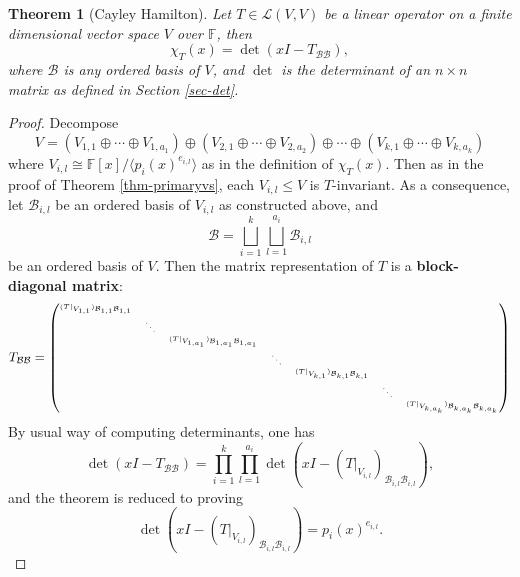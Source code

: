 \documentclass[12pt]{amsbook}
\newtheorem{theorem}{Theorem}[section]
\begin{document}
\begin{theorem}[Cayley Hamilton]
    Let $T \in \mathcal{L}(V,V)$ be a linear operator on a finite dimensional vector space $V$ over $\mathbb{F}$, then
    $$\chi_T(x) = \det(xI -T_{\mathcal{B}\mathcal{B}}),$$
    where $\mathcal{B}$ is any ordered basis of $V$, and $\det$ is the determinant of an $n \times n$ matrix as defined in Section \ref{sec-det}. 
\end{theorem}

\begin{proof}
 Decompose
$$V= (V_{1,1} \oplus \cdots \oplus V_{1,a_1}) \oplus 
(V_{2,1} \oplus \cdots \oplus V_{2,a_2}) \oplus \cdots \oplus 
(V_{k,1} \oplus \cdots \oplus V_{k,a_k})$$
where $V_{i,l} \cong \mathbb{F}[x]/\langle p_i(x)^{e_{i,l}} \rangle$ as in the definition of $\chi_{T}(x)$. Then as in the proof of Theorem \ref{thm-primaryvs}, each $V_{i,l} \leq V$ is $T$-invariant. As a consequence, let $\mathcal{B}_{i,l}$ be an ordered basis of $V_{i,l}$ as constructed above, and
$$\mathcal{B} = \bigsqcup_{i=1}^k \bigsqcup_{l = 1}^{a_i} \mathcal{B}_{i,l}$$
be an ordered basis of $V$. Then the matrix representation of $T$ is a {\bf block-diagonal matrix}:
$$T_{\mathcal{B}\mathcal{B}} = \tiny{\begin{pmatrix} (T|_{V_{1,1}})_{\mathcal{B}_{1,1}\mathcal{B}_{1,1}} & & & & & \\
& \ddots & & & & & \\ 
& & (T|_{V_{1,a_1}})_{\mathcal{B}_{1,a_1}\mathcal{B}_{1,a_1}} & & & & \\
& & & \ddots & & &\\
& & & & (T|_{V_{k,1}})_{\mathcal{B}_{k,1}\mathcal{B}_{k,1}} & & \\
& & & & & \ddots & \\
& & & & & & (T|_{V_{k,a_k}})_{\mathcal{B}_{k,a_k}\mathcal{B}_{k,a_k}}\end{pmatrix}}
$$
By usual way of computing determinants, one has
$$\det(xI-T_{\mathcal{B}\mathcal{B}}) = \prod_{i = 1}^k \prod_{l = 1}^{a_i} \det(xI - (T|_{V_{i,l}})_{\mathcal{B}_{i,l}\mathcal{B}_{i,l}}),$$
and the theorem is reduced to proving
$$\det(xI - (T|_{V_{i,l}})_{\mathcal{B}_{i,l}\mathcal{B}_{i,l}}) = p_i(x)^{e_{i,l}}.$$


\end{proof}
\end{document}
